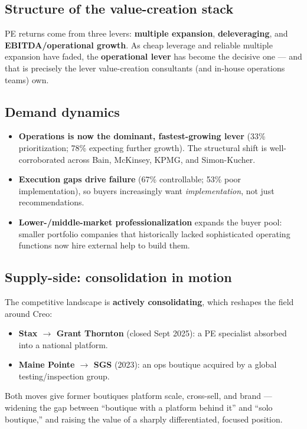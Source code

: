 \documentclass[11pt]{article}
\begin{document}
\subsection{Structure of the value-creation stack}
PE returns come from three levers: \textbf{multiple expansion},
\textbf{deleveraging}, and \textbf{EBITDA/operational growth}. As cheap leverage
and reliable multiple expansion have faded, the \textbf{operational lever} has
become the decisive one --- and that is precisely the lever value-creation
consultants (and in-house operations teams) own.

\subsection{Demand dynamics}
\begin{itemize}
  \item \textbf{Operations is now the dominant, fastest-growing lever}
  (33\% prioritization; 78\% expecting further growth). The structural shift is
  well-corroborated across Bain, McKinsey, KPMG, and Simon-Kucher.
  \item \textbf{Execution gaps drive failure} (67\% controllable; 53\% poor
  implementation), so buyers increasingly want \emph{implementation}, not just
  recommendations.
  \item \textbf{Lower-/middle-market professionalization} expands the buyer pool:
  smaller portfolio companies that historically lacked sophisticated operating
  functions now hire external help to build them.
\end{itemize}

\subsection{Supply-side: consolidation in motion}
The competitive landscape is \textbf{actively consolidating}, which reshapes the
field around Creo:
\begin{itemize}
  \item \textbf{Stax $\rightarrow$ Grant Thornton} (closed Sept 2025): a PE
  specialist absorbed into a national platform.
  \item \textbf{Maine Pointe $\rightarrow$ SGS} (2023): an ops boutique acquired
  by a global testing/inspection group.
\end{itemize}
Both moves give former boutiques platform scale, cross-sell, and brand ---
widening the gap between ``boutique with a platform behind it'' and ``solo
boutique,'' and raising the value of a sharply differentiated, focused position.
\end{document}
